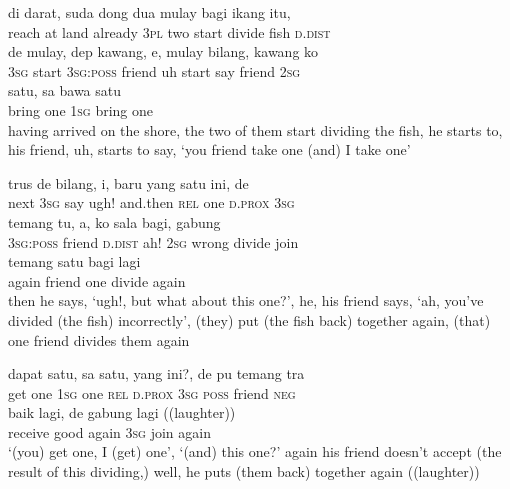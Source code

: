\ea
{}   di    {darat,}    {suda}    {dong}    {dua}    {mulay}    {bagi}   ikang   itu,\\
   {reach}   at    {land}    {already}    {\textsc{3pl}}    {two}    {start}    {divide}   fish   \textsc{d.dist}\\
\gll de    {mulay,}    {dep}    {kawang,}    {e,}    {mulay}    {bilang,}    {kawang}   ko\\
  \textsc{3sg}    {start}    {\textsc{3sg}:\textsc{poss}}    {friend}    {uh}    {start}    {say}    {friend}   \textsc{2sg}\\
    {satu,}   sa    {bawa}    {satu}\\
   {bring}    {one}   \textsc{1sg}    {bring}    {one}\\
\glt
having arrived on the shore, the two of them start dividing the fish, he starts to, his friend, uh, starts to say, ‘you friend take one (and) I take one’
\z

\ea
\gll   trus    {de}    {bilang,}    {i,}    {baru}    {yang}    {satu}    {ini,}   de\\
  next    {\textsc{3sg}}    {say}    {ugh!}    {and.then}    {\textsc{rel}}    {one}    {\textsc{d.prox}}   \textsc{3sg}\\
    {temang}    {tu,}    {a,}    {ko}    {sala}    {bagi,}    {gabung}\\
   {\textsc{3sg}:\textsc{poss}}    {friend}    {\textsc{d.dist}}    {ah!}    {\textsc{2sg}}    {wrong}    {divide}    {join}\\
    {temang}    {satu}    {bagi}    {lagi}\\
   {again}    {friend}    {one}    {divide}    {again}\\
\glt
then he says, ‘ugh!, but what about this one?’, he, his friend says, ‘ah, you’ve divided (the fish) incorrectly’, (they) put (the fish back) together again, (that) one friend divides them again
\z

\ea
\gll   dapat    {satu,}    {sa}    {satu,}    {yang}    {ini?,}    {de}   pu   temang   tra\\
  get    {one}    {\textsc{1sg}}    {one}    {\textsc{rel}}    {\textsc{d.prox}}    {\textsc{3sg}}   \textsc{poss}   friend   \textsc{neg}\\
    {baik}    {lagi,}    {de}    {gabung}    {lagi}    {((laughter))}\\
   {receive}    {good}    {again}    {\textsc{3sg}}    {join}    {again}    {}\\
\glt
‘(you) get one, I (get) one’, ‘(and) this one?’ again his friend doesn’t accept (the result of this dividing,) well, he puts (them back) together again ((laughter))
\z


